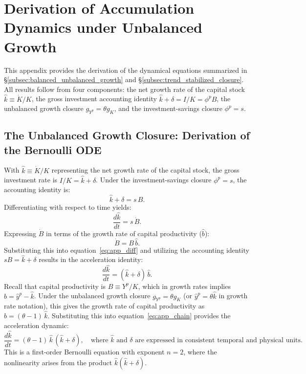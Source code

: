 \section{Derivation of Accumulation Dynamics under Unbalanced Growth}
\label{app:acc_dynamics}

This appendix provides the derivation of the dynamical equations summarized in \S\ref{subsec:balanced_unbalanced_growth} and \S\ref{subsec:trend_stabilized_closure}. All results follow from four components: the net growth rate of the capital stock $\hat{k} \equiv \dot{K}/K$, the gross investment accounting identity $\hat{k} + \delta = I/K = \phi^p B$, the unbalanced growth closure $g_{Y^p} = \theta g_K$, and the investment-savings closure $\phi^p = s$.

\subsection{The Unbalanced Growth Closure: Derivation of the Bernoulli ODE}
\label{app:bernoulli}

With $\hat{k} \equiv \dot{K}/K$ representing the net growth rate of the capital stock, the gross investment rate is $I/K = \hat{k} + \delta$. Under the investment-savings closure $\phi^p = s$, the accounting identity is:
\begin{equation}\label{eq:app_identity}
    \hat{k} + \delta = s \, B.
\end{equation}
Differentiating with respect to time yields:
\begin{equation}\label{eq:app_diff}
    \frac{d\hat{k}}{dt} = s \, \dot{B}.
\end{equation}
Expressing $\dot{B}$ in terms of the growth rate of capital productivity ($\hat{b}$):
\begin{equation}\label{eq:app_Bdot}
    \dot{B} = B \, \hat{b}.
\end{equation}
Substituting this into equation~\eqref{eq:app_diff} and utilizing the accounting identity $sB = \hat{k} + \delta$ results in the acceleration identity:
\begin{equation}\label{eq:app_chain}
    \frac{d\hat{k}}{dt} = (\hat{k} + \delta) \, \hat{b}.
\end{equation}
Recall that capital productivity is $B \equiv Y^p / K$, which in growth rates implies $\hat{b} = \hat{y}^p - \hat{k}$. Under the unbalanced growth closure $g_{Y^p} = \theta g_K$ (or $\hat{y}^p = \theta \hat{k}$ in growth rate notation), this gives the growth rate of capital productivity as $\hat{b} = (\theta - 1) \, \hat{k}$. Substituting this into equation~\eqref{eq:app_chain} provides the acceleration dynamic:
\begin{equation}\label{eq:app_bernoulli}
    \boxed{\frac{d\hat{k}}{dt} = (\theta - 1) \, \hat{k} \, (\hat{k} + \delta)}, \quad \text{where } \hat{k} \text{ and } \delta \text{ are expressed in consistent temporal and physical units}.
\end{equation}
This is a first-order Bernoulli equation with exponent $n=2$, where the nonlinearity arises from the product $\hat{k}(\hat{k} + \delta)$.

